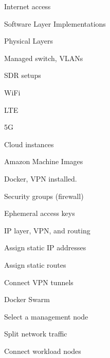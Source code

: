 \begin{outline}
\begin{outline}
\begin{outline}
\begin{outline}
                \item Internet access
            \end{outline}
            \item Software Layer Implementations
            \begin{outline}
                \item Physical Layers
                \begin{outline}
                    \item Managed switch, VLANs
                    \item SDR setups
                    \begin{outline}
                        \item WiFi
                        \item LTE
                        \item 5G
                    \end{outline}
                \end{outline}
                \item Cloud instances
                \begin{outline}
                    \item Amazon Machine Images
                    \item Docker, VPN installed.
                    \item Security groups (firewall)
                    \item Ephemeral access keys
                \end{outline}
                \item IP layer, VPN, and routing
                \begin{outline}
                    \item Assign static IP addresses
                    \item Assign static routes
                    \item Connect VPN tunnels
                \end{outline}
                \item Docker Swarm
                \begin{outline}
                    \item Select a management node
                    \item Split network traffic
                    \item Connect workload nodes
                \end{outline}

\end{outline}
\end{outline}
\end{outline}
\end{outline}

